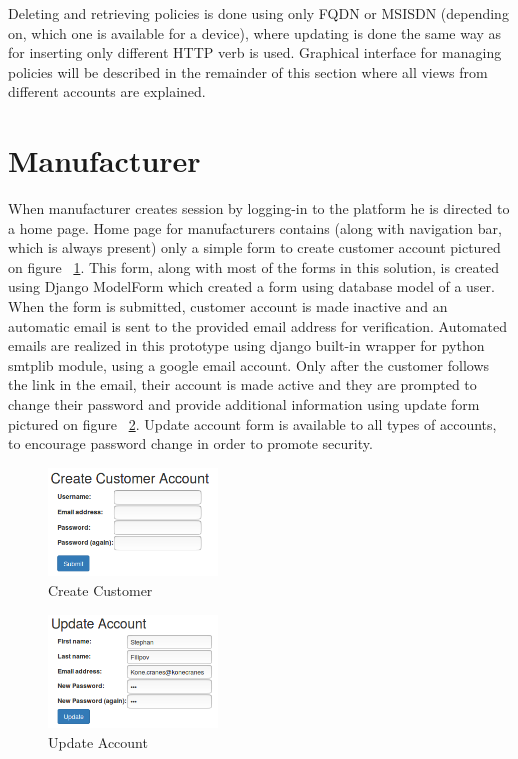 Deleting and retrieving policies is done using only FQDN or MSISDN (depending on, which one is available for a device), where updating is done the same way as for inserting only different HTTP verb is used. Graphical interface for managing policies will be described in the remainder of this section where all views from different accounts are explained.

\section{Manufacturer}
\label{Manufacturer}

When manufacturer creates session by logging-in to the platform he is directed to a home page. Home page for manufacturers contains (along with navigation bar, which is always present) only a simple form to create customer account pictured on figure ~\ref{fig:CreateCustomer}. This form, along with most of the forms in this solution, is created using Django ModelForm which created a form using database model of a user. When the form is submitted, customer account is made inactive and an automatic email is sent to the provided email address for verification. Automated emails are realized in this prototype using django built-in wrapper for python smtplib module, using a google email account. Only after the customer follows the link in the email, their account is made active and they are prompted to change their password and provide additional information using update form pictured on figure ~\ref{fig:UpdateAccount}. Update account form is available to all types of accounts, to encourage password change in order to promote security.

\begin{figure}
	\begin{center}
		\includegraphics[width=0.4\textwidth]{images/implementation/CreateCustomer}
		\caption{Create Customer}
		\label{fig:CreateCustomer}
	\end{center}
\end{figure}

\begin{figure}[ht]
	\begin{center}
		\includegraphics[width=0.4\textwidth]{images/implementation/UpdateAccount}
		\caption{Update Account}
		\label{fig:UpdateAccount}
	\end{center}
\end{figure}

